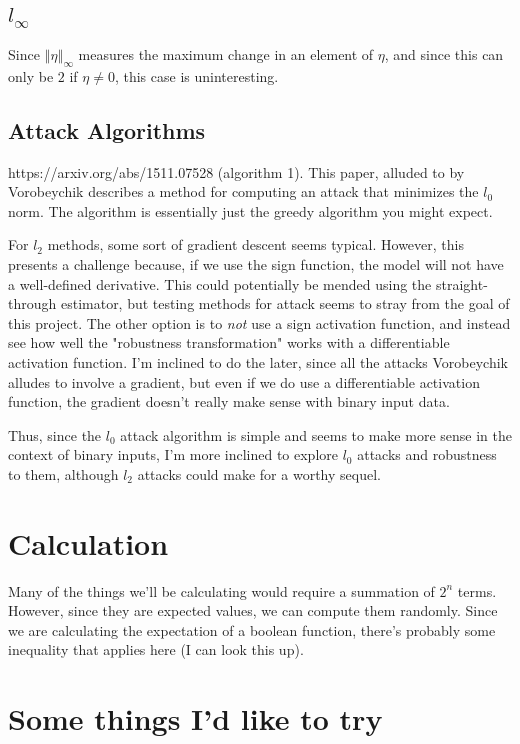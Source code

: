 \documentclass{article}
\newcommand{\norm}[1]{\left\Vert #1 \right\Vert}
\begin{document}
\subsection{$l_\infty$}

Since $\norm{\eta}_\infty$ measures the maximum change in an element of $\eta$, and since this can only be $2$ if $\eta \ne 0$, this case is uninteresting.


\subsection{Attack Algorithms}

https://arxiv.org/abs/1511.07528 (algorithm 1). This paper, alluded to by Vorobeychik describes a method for computing an attack that minimizes the $l_0$ norm. The algorithm is essentially just the greedy algorithm you might expect.

For $l_2$ methods, some sort of gradient descent seems typical. However, this presents a challenge because, if we use the sign function, the model will not have a well-defined derivative. This could potentially be mended using the straight-through estimator, but testing methods for attack seems to stray from the goal of this project. The other option is to \textit{not} use a sign activation function, and instead see how well the "robustness transformation" works with a differentiable activation function. I'm inclined to do the later, since all the attacks Vorobeychik alludes to involve a gradient, but even if we do use a differentiable activation function, the gradient doesn't really make sense with binary input data.

Thus, since the $l_0$ attack algorithm is simple and seems to make more sense in the context of binary inputs, I'm more inclined to explore $l_0$ attacks and robustness to them, although $l_2$ attacks could make for a worthy sequel.

\section{Calculation}

Many of the things we'll be calculating would require a summation of $2^n$ terms. However, since they are expected values, we can compute them randomly. Since we are calculating the expectation of a boolean function, there's probably some inequality that applies here (I can look this up).

\section{Some things I'd like to try}
\end{document}
